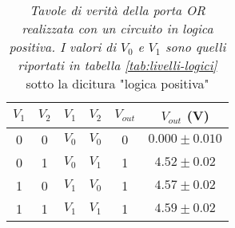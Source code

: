 \begin{table}[H]
  \centering
  \begin{tabular}[t]{c  c | c  c | c  c}
    \hline
    $V_{1}$ & $V_{2}$ & $V_{1}$ & $V_{2}$ & $V_{out}$ & $V_{out}$ (V) \\
    \hline
    0 & 0 & $V_{0}$ & $V_{0}$ & 0 & $0.000 \pm 0.010$ \\
    0 & 1 & $V_{0}$ & $V_{1}$ & 1 & $4.52 \pm 0.02$ \\
    1 & 0 & $V_{1}$ & $V_{0}$ & 1 & $4.57 \pm 0.02$ \\
    1 & 1 & $V_{1}$ & $V_{1}$ & 1 & $4.59 \pm 0.02$ \\
    \hline
  \end{tabular}
  \caption{\emph{Tavole di verità della porta \emph{OR} realizzata con un circuito in logica positiva. I valori di $V_{0}$ e $V_{1}$ sono quelli riportati in tabella \ref{tab:livelli-logici}} sotto la dicitura "logica positiva"}
  \label{tab:or-logicapositiva}
\end{table}
